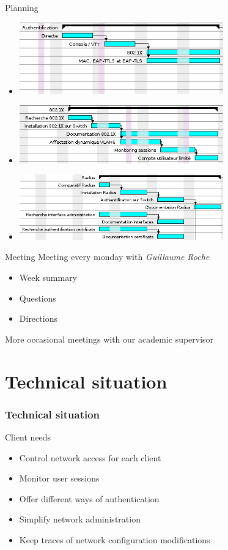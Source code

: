 \documentclass[12pt]{beamer}
\begin{document}
\begin{frame}{Planning}
    \begin{itemize}
	\item \includegraphics[width=250pt]{img/gantt_auth.png}
	\vfill
	\item \includegraphics[width=250pt]{img/gantt_dot1x.png}
	\vfill
	\item \includegraphics[width=250pt]{img/gantt_radius.png}
    \end{itemize}
\end{frame}


\begin{frame}{Meeting}
    Meeting every monday with \emph{Guillaume Roche}
    \vfill
    \begin{itemize}
	\item Week summary
	\item Questions 
	\item Directions 
    \end{itemize}
    \vfill
    More occasional meetings with our academic supervisor
\end{frame}


\part{Technical situation}
\frame{\partpage}
\section{Technical situation}

\begin{frame}{Client needs}
    \begin{itemize}
	\item Control network access for each client
	\vfill
	\item Monitor user sessions
	\vfill 
	\item Offer different ways of authentication
	\vfill
	\item Simplify network administration
	\vfill
	\item Keep traces of network configuration modifications
    \end{itemize}
\end{frame}
\end{document}
